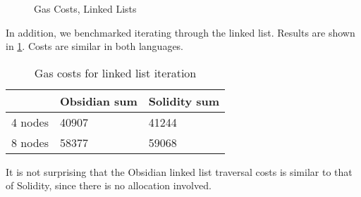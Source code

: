 \begin{figure}[hbtp]
    \caption{Gas Costs, Linked Lists}
    \label{data.3}
\end{figure}

%
%


In addition, we benchmarked iterating through the linked list. Results are shown in \cref{tab:iteration}. Costs are similar in both languages.
\begin{table}
\caption{Gas costs for linked list iteration}
\label{tab:iteration}
\begin{tabular}{lll}
\toprule
& Obsidian sum & Solidity sum \\
\midrule
4 nodes & 40907 & 41244 \\
8 nodes & 58377 & 59068 \\
\bottomrule
\end{tabular}
\end{table}

It is not surprising that the Obsidian linked list traversal costs is similar to that of Solidity, since there is no allocation involved. 
